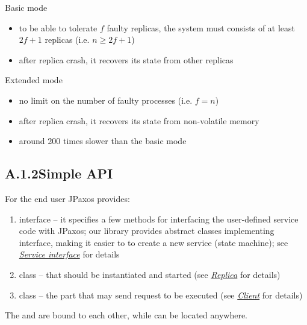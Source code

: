 Basic mode
\begin{itemize}
\item {} 
to be able to tolerate $f$ faulty replicas, the system must consists
of at least $2f + 1$ replicas (i.e. $n \ge 2f + 1$)

\item {} 
after replica crash, it recovers its state from other replicas

\end{itemize}

Extended mode
\begin{itemize}
\item {} 
no limit on the number of faulty processes (i.e. $f = n$)

\item {} 
after replica crash, it recovers its state from non-volatile memory

\item {} 
around 200 times slower than the basic mode

\end{itemize}


\subsection*{A.1.2\quad Simple API}
\label{overview:simple-api}
For the end user JPaxos provides:
\begin{enumerate}
\item {} 
 interface -- it specifies a few methods for interfacing
the user-defined servi\-ce code with JPaxos; our library provides
abstract classes implementing  interface, making it easier to
to create a new service (state machine);\linebreak
see {\hyperref[api:jpaxos-service]{\emph{Service interface}}} for details

\item {} 
 class -- that should be instantiated and started
(see {\hyperref[api:jpaxos-replica]{\emph{Replica}}} for details)

\item {} 
 class -- the part that may send request to be executed
(see {\hyperref[api:jpaxos-client]{\emph{Client}}} for details)

\end{enumerate}

The  and  are bound to each other, while
 can be located anywhere.


